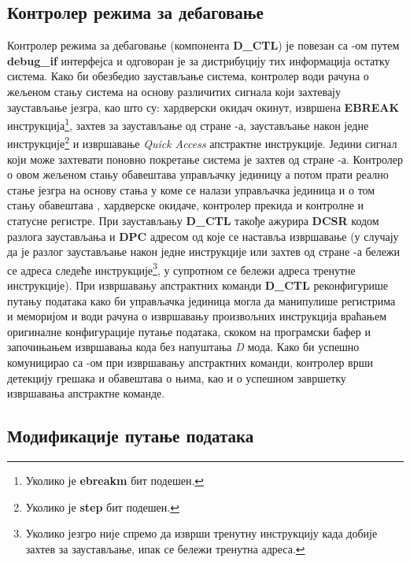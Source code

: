 \subsection{Контролер режима за дебаговање}

Контролер режима за дебаговање (компонента \textbf{D\_CTL}) је повезан са -ом путем \textbf{debug\_if} интерфејса и одговоран је за дистрибуцију тих информација остатку система.
Како би обезбедио заустављање система, контролер води рачуна о жељеном стању система на основу различитих сигнала који захтевају заустављање језгра, као што су: хардверски окидач окинут, извршена \textbf{EBREAK} инструкција\footnote{Уколико је \textbf{ebreakm} бит подешен.}, захтев за заустављање од стране -а, заустављање након једне инструкције\footnote{Уколико је \textbf{step} бит подешен.} и извршавање \textit{Quick Access} апстрактне инструкције. Једини сигнал који може захтевати поновно покретање система је захтев од стране -а. Контролер о овом жељеном стању обавештава управљачку јединицу а потом прати реално стање језгра на основу стања у коме се налази управљачка јединица и о том стању обавештава , хардверске окидаче, контролер прекида и контролне и статусне регистре. При заустављању \textbf{D\_CTL} такође ажурира \textbf{\acrshort{DCSR}} кодом разлога заустављања и \textbf{\acrshort{DPC}} адресом од које се наставља извршавање (у случају да је разлог заустављање након једне инструкције или захтев од стране -а бележи се адреса следеће инструкције\footnote{Уколико језгро није спремо да изврши тренутну инструкцију када добије захтев за заустављање, ипак се бележи тренутна адреса.}, у супротном се бележи адреса тренутне инструкције).
При извршавању апстрактних команди \textbf{D\_CTL} реконфигурише путању података како би управљачка јединица могла да манипулише регистрима и меморијом и води рачуна о извршавању произвољних инструкција враћањем оригиналне конфигурације путање података, скоком на програмски бафер и започињањем извршавања кода без напуштања \textit{D} мода. Како би успешно комуницирао са -ом при извршавању апстрактних команди, контролер врши детекцију грешака и обавештава  о њима, као и о успешном завршетку извршавања апстрактне команде.

\subsection{Модификације путање података}

